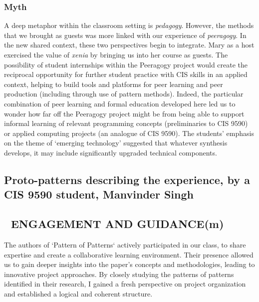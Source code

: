 \documentclass[acmlarge,timestamp]{acmart}
\newcommand{\motor}{(m)}
\begin{document}
\subsubsection{Myth}
A deep metaphor within the classroom setting is \emph{pedagogy}.
However, the methods that we brought as guests was more linked with
our experience of \emph{peeragogy}.  In the new shared context, these
two perspectives begin to integrate.  Mary as a host exercised the
value of \emph{xenia} by bringing us into her course as guests.  The
possibility of student internships within the Peeragogy project would
create the reciprocal opportunity for further student practice with
CIS skills in an applied context, helping to build tools and platforms
for peer learning and peer production (including through use of
pattern methods).  Indeed, the particular combination of peer learning
and formal education developed here led us to wonder how far off the
Peeragogy project might be from being able to support informal
learning of relevant programming concepts (preliminaries to CIS 9590)
or applied computing projects (an analogue of CIS 9590).  The
students’ emphasis on the theme of ‘emerging technology’ suggested
that whatever synthesis develops, it may include significantly
upgraded technical components.

\subsection{Proto-patterns describing the experience, by a CIS 9590 student, Manvinder Singh}\label{sec:manny-protopatterns}


\subsection*{💎 ENGAGEMENT AND GUIDANCE{\hfill \motor}}
The authors of ‘Pattern of Patterns‘ actively participated in our
class, to share expertise and create a collaborative learning
environment. Their presence allowed us to gain deeper insights into
the paper's concepts and methodologies, leading to innovative project
approaches. By closely studying the patterns of patterns identified in
their research, I gained a fresh perspective on project organization
and established a logical and coherent structure.
\end{document}
